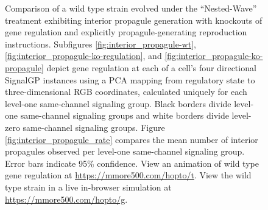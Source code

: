 \begin{figure}[!htbp]
\begin{center}
\caption{
Comparison of a wild type strain evolved under the ``Nested-Wave'' treatment exhibiting interior propagule generation with knockouts of gene regulation and explicitly propagule-generating reproduction instructions.
Subfigures \ref{fig:interior_propagule-wt}, \ref{fig:interior_propagule-ko-regulation}, and \ref{fig:interior_propagule-ko-propagule} depict gene regulation at each of a cell's four directional SignalGP instances using a PCA mapping from regulatory state to three-dimensional RGB coordinates, calculated uniquely for each level-one same-channel signaling group.
Black borders divide level-one same-channel signaling groups and white borders divide level-zero same-channel signaling groups.
Figure \ref{fig:interior_propagule_rate} compares the mean number of interior propagules observed per level-one same-channel signaling group.
Error bars indicate 95\% confidence.
View an animation of wild type gene regulation at \url{https://mmore500.com/hopto/t}.
View the wild type strain in a live in-browser simulation at \url{https://mmore500.com/hopto/g}.
}
\label{fig:ko-interior_propagule}
\end{center}
\end{figure}
